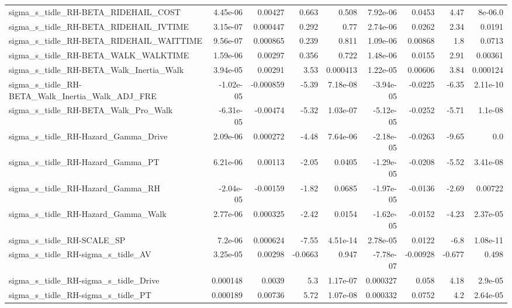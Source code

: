 \begin{tabular}{lrrrrrrrr}
sigma\_s\_tidle\_RH-BETA\_RIDEHAIL\_COST                &    4.45e-06 &      0.00427 &    0.663 &    0.508 &   7.92e-06 &      0.0453 &         4.47 &       8e-06.0 \\
sigma\_s\_tidle\_RH-BETA\_RIDEHAIL\_IVTIME              &    3.15e-07 &     0.000447 &    0.292 &     0.77 &   2.74e-06 &      0.0262 &         2.34 &        0.0191 \\
sigma\_s\_tidle\_RH-BETA\_RIDEHAIL\_WAITTIME            &    9.56e-07 &     0.000865 &    0.239 &    0.811 &   1.09e-06 &     0.00868 &          1.8 &        0.0713 \\
sigma\_s\_tidle\_RH-BETA\_WALK\_WALKTIME                &    1.59e-06 &      0.00297 &    0.356 &    0.722 &   1.48e-06 &      0.0155 &         2.91 &       0.00361 \\
sigma\_s\_tidle\_RH-BETA\_Walk\_Inertia\_Walk            &    3.94e-05 &      0.00291 &     3.53 & 0.000413 &   1.22e-05 &     0.00606 &         3.84 &      0.000124 \\
sigma\_s\_tidle\_RH-BETA\_Walk\_Inertia\_Walk\_ADJ\_FRE    &   -1.02e-05 &    -0.000859 &    -5.39 & 7.18e-08 &  -3.94e-05 &     -0.0225 &        -6.35 &      2.11e-10 \\
sigma\_s\_tidle\_RH-BETA\_Walk\_Pro\_Walk                &   -6.31e-05 &     -0.00474 &    -5.32 & 1.03e-07 &  -5.12e-05 &     -0.0252 &        -5.71 &       1.1e-08 \\
sigma\_s\_tidle\_RH-Hazard\_Gamma\_Drive                &    2.09e-06 &     0.000272 &    -4.48 & 7.64e-06 &  -2.18e-05 &     -0.0263 &        -9.65 &           0.0 \\
sigma\_s\_tidle\_RH-Hazard\_Gamma\_PT                   &    6.21e-06 &      0.00113 &    -2.05 &   0.0405 &  -1.29e-05 &     -0.0208 &        -5.52 &      3.41e-08 \\
sigma\_s\_tidle\_RH-Hazard\_Gamma\_RH                   &   -2.04e-05 &     -0.00159 &    -1.82 &   0.0685 &  -1.97e-05 &     -0.0136 &        -2.69 &       0.00722 \\
sigma\_s\_tidle\_RH-Hazard\_Gamma\_Walk                 &    2.77e-06 &     0.000325 &    -2.42 &   0.0154 &  -1.62e-05 &     -0.0152 &        -4.23 &      2.37e-05 \\
sigma\_s\_tidle\_RH-SCALE\_SP                          &     7.2e-06 &     0.000624 &    -7.55 & 4.51e-14 &   2.78e-05 &      0.0122 &         -6.8 &      1.08e-11 \\
sigma\_s\_tidle\_RH-sigma\_s\_tidle\_AV                  &    3.25e-05 &      0.00298 &  -0.0663 &    0.947 &  -7.78e-07 &    -0.00928 &       -0.677 &         0.498 \\
sigma\_s\_tidle\_RH-sigma\_s\_tidle\_Drive               &    0.000148 &       0.0039 &      5.3 & 1.17e-07 &   0.000327 &       0.058 &         4.18 &       2.9e-05 \\
sigma\_s\_tidle\_RH-sigma\_s\_tidle\_PT                  &    0.000189 &      0.00736 &     5.72 & 1.07e-08 &   0.000332 &      0.0752 &          4.2 &      2.64e-05 \\
\bottomrule
\end{tabular}
